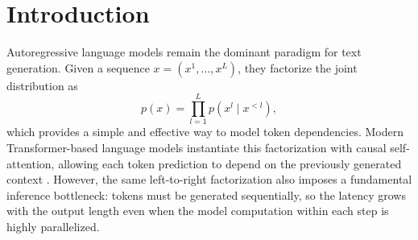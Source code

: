 \documentclass{article} %
\begin{document}
\begin{abstract}
\end{abstract}


\section{Introduction}
Autoregressive language models remain the dominant paradigm for text generation. 
Given a sequence $x=(x^1,\ldots,x^L)$, they factorize the joint distribution as
\begin{equation}
    p(x)=\prod_{l=1}^{L} p(x^l \mid x^{<l}),
\end{equation}
which provides a simple and effective way to model token dependencies. 
Modern Transformer-based language models instantiate this factorization with causal self-attention, allowing each token prediction to depend on the previously generated context \citep{vaswani2017attention}. 
However, the same left-to-right factorization also imposes a fundamental inference bottleneck: tokens must be generated sequentially, so the latency grows with the output length even when the model computation within each step is highly parallelized.
\end{document}
